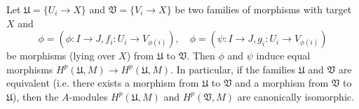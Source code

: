 \begin{corollary}\label{ringed topos presheaf Cech cohomology refinement prop}
Let $\mathfrak{U}=\{U_i\to X\}$ and $\mathfrak{V}=\{V_i\to X\}$ be two families of morphisms with target $X$ and
\[\phi=(\phi:I\to J,f_i:U_i\to V_{\phi(i)}),\quad \phi=(\psi:I\to J,g_i:U_i\to V_{\phi(i)})\]
be morphisms (lying over $X$) from $\mathfrak{U}$ to $\mathfrak{V}$. Then $\phi$ and $\psi$ induce equal morphisms $H^p(\mathfrak{U},M)\to H^p(\mathfrak{U},M)$. In particular, if the families $\mathfrak{U}$ and $\mathfrak{V}$ are equivalent (i.e. there exists a morphism from $\mathfrak{U}$ to $\mathfrak{V}$ and a morphism from $\mathfrak{V}$ to $\mathfrak{U}$), then the $A$-modules $H^p(\mathfrak{U},M)$ and $H^p(\mathfrak{V},M)$ are canonically isomorphic.
\end{corollary}

